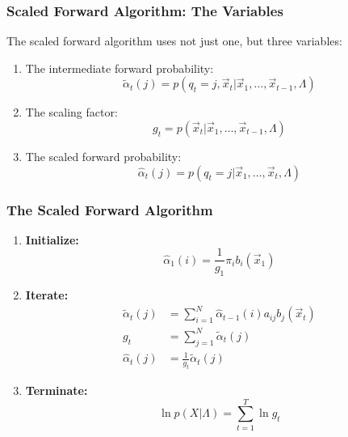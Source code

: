 \documentclass{beamer}
\begin{document}
\begin{frame}
  \frametitle{Scaled Forward Algorithm: The Variables}

  The scaled forward algorithm uses not just one, but three variables:
  \begin{enumerate}
  \item The intermediate forward probability:
    \begin{displaymath}
      \tilde\alpha_t(j) = p(q_t=j,\vec{x}_t|\vec{x}_1,\ldots,\vec{x}_{t-1},\Lambda)
    \end{displaymath}
  \item The scaling factor:
    \begin{displaymath}
      g_t = p(\vec{x}_t|\vec{x}_1,\ldots,\vec{x}_{t-1},\Lambda)
    \end{displaymath}
  \item The scaled forward probability:
    \begin{displaymath}
      \hat\alpha_t(j) = p(q_t=j|\vec{x}_1,\ldots,\vec{x}_{t},\Lambda)
    \end{displaymath}
  \end{enumerate}
\end{frame}

\begin{frame}
  \frametitle{The Scaled Forward Algorithm}

  \begin{enumerate}
  \item {\bf Initialize:}
    \[
    \hat\alpha_1(i) = \frac{1}{g_1}\pi_i b_i(\vec{x}_1)
    \]
  \item {\bf Iterate:}
    \begin{align*}
      \tilde\alpha_{t}(j) &= \sum_{i=1}^N \hat\alpha_{t-1}(i) a_{ij}b_j(\vec{x}_t)\\
      g_t &= \sum_{j=1}^N \tilde\alpha_t(j)\\
      \hat\alpha_{t}(j) &= \frac{1}{g_t}\tilde\alpha_t(j)
    \end{align*}
  \item {\bf Terminate:}
    \[
    \ln p(X|\Lambda) = \sum_{t=1}^T \ln g_t
    \]
  \end{enumerate}
\end{frame}
\end{document}
